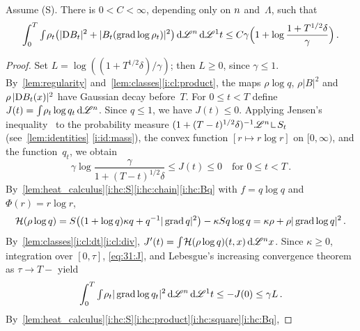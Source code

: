 \documentclass[a4paper,twoside,leqno]{article}
\newcommand{\heatop}{\mathcal{H}}          %
\begin{document}
\begin{lemma}
    \label{lem:DGPR31}
    Assume (S). There is $0 < C < \infty$, depending only on $n$ and~$\Lambda$, such that
    \begin{displaymath}
        \int_0^T {\textstyle\int_{}^{}} \rho_t \bigl( |\mathrm{D} B_t|^2 + |B_t(\operatorname{grad} \log \rho_t)|^2 \bigr) \,\mathrm{d}
        \mathscr{L}^{n} \,\mathrm{d} \mathscr{L}^1 t \le C \gamma \Bigl( 1 + \log \frac{1 + T^{1/2} \delta}{\gamma}
        \Bigr) \,.
    \end{displaymath}
\end{lemma}

\begin{proof}
    Set $L = \log((1 + T^{1/2} \delta)/\gamma)$; then $L \ge 0$, since $\gamma \le 1$.
    By~\ref{lem:regularity} and~\ref{lem:classes}\ref{i:cl:product}, the maps $\rho \log q$,
    $\rho |B|^2$ and $\rho \, |\mathrm{D} B_t(x)|^2$ have Gaussian decay before~$T$. For $0 \le t < T$
    define $J(t) = {\textstyle\int_{}^{}} \rho_t \log q_t \,\mathrm{d} \mathscr{L}^{n}$. Since $q \le 1$, we have $J(t)
    \le 0$. Applying Jensen's inequality~\cite[2.4.19]{Federer1969} to the probability measure
    $(1 + (T-t)^{1/2} \delta)^{-1} \LM^{\adim} \restrict S_t$ (see~\ref{lem:identities}
    \ref{i:id:mass}), the convex function $[r \mapsto r \log r]$ on $[0,\infty)$, and the
    function~$q_t$, we obtain
    \begin{equation}
        \label{eq:31:J}
        \gamma \log \frac{\gamma}{1 + (T-t)^{1/2} \delta} \le J(t) \le 0
        \quad \text{for $0 \le t < T$} \,.
    \end{equation}
    By~\ref{lem:heat_calculus}\ref{i:hc:S}\ref{i:hc:chain}\ref{i:hc:Bq} with $f = q \log q$ and
    $\Phi(r) = r \log r$,
    \begin{displaymath}
        \heatop(\rho \log q) = S \bigl( (1 + \log q) \kappa q + q^{-1} |\grad q|^2 \bigr) - \kappa
        S q \log q = \kappa \rho + \rho |\grad \log q|^2 \,.
    \end{displaymath}
    By~\ref{lem:classes}\ref{i:cl:dt}\ref{i:cl:div}, $J'(t) = \textint{}{} \heatop(\rho \log
    q)(t,x) \ud \LM^{\adim} x$. Since $\kappa \ge 0$, integration over $[0,\tau]$,
    \eqref{eq:31:J}, and Lebesgue's increasing convergence theorem~\cite[2.4.7]{Federer1969} as
    $\tau \to T-$ yield
    \begin{equation}
        \label{eq:31:gradq}
        \int_0^T {\textstyle\int_{}^{}} \rho_t |\operatorname{grad} \log q_t|^2 \,\mathrm{d} \mathscr{L}^{n} \,\mathrm{d} \mathscr{L}^1 t \le - J(0)
        \le \gamma L \,.
    \end{equation}
    By~\ref{lem:heat_calculus}\ref{i:hc:S}\ref{i:hc:product}\ref{i:hc:square}\ref{i:hc:Bq},

\end{proof}
\end{document}
